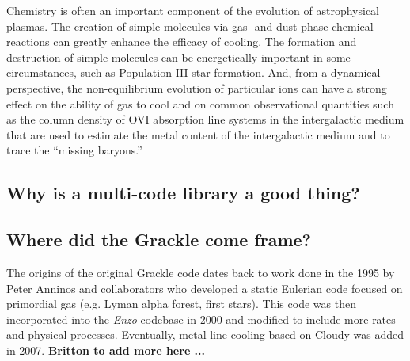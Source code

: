 Chemistry is often an important component of the evolution of
astrophysical plasmas.  The creation of simple molecules via gas- and
dust-phase chemical reactions can greatly enhance the efficacy of
cooling. \citep{1979ApJS...41..555H,2005ApJ...626..627O} The formation
and destruction of simple molecules can be energetically important in
some circumstances, such as Population III star formation.
\citep{1998ApJ...508..141O,2002Sci...295...93A,2008MNRAS.388.1627G,2009Sci...325..601T}
And, from a dynamical perspective, the non-equilibrium evolution of
particular ions can have a strong effect on the ability of gas to cool
\citep{1997NewA....2..181A,1997NewA....2..209A} and on common
observational quantities such as the column density of OVI absorption
line systems in the intergalactic medium that are used to estimate the
metal content of the intergalactic medium and to trace the ``missing
baryons.'' \citep{2006ApJ...650..573C,2011ApJ...731....6S,2013MNRAS.434.1043O,2014ApJ...796...49S}


\subsection{Why is a multi-code library a good thing?}


\subsection{Where did the Grackle come frame?}

The origins of the original Grackle code dates back to work done in the 1995 by Peter Anninos and collaborators \citep{1997NewA....2..209A} who developed a static Eulerian code focused on primordial gas (e.g. Lyman alpha forest, first stars).  This code was then incorporated into the {\it Enzo} codebase in 2000 and modified to include more rates and physical processes.  Eventually, metal-line cooling based on Cloudy \citep{2008MNRAS.385.1443S} was added in 2007.  {\bf Britton to add more here ...}
